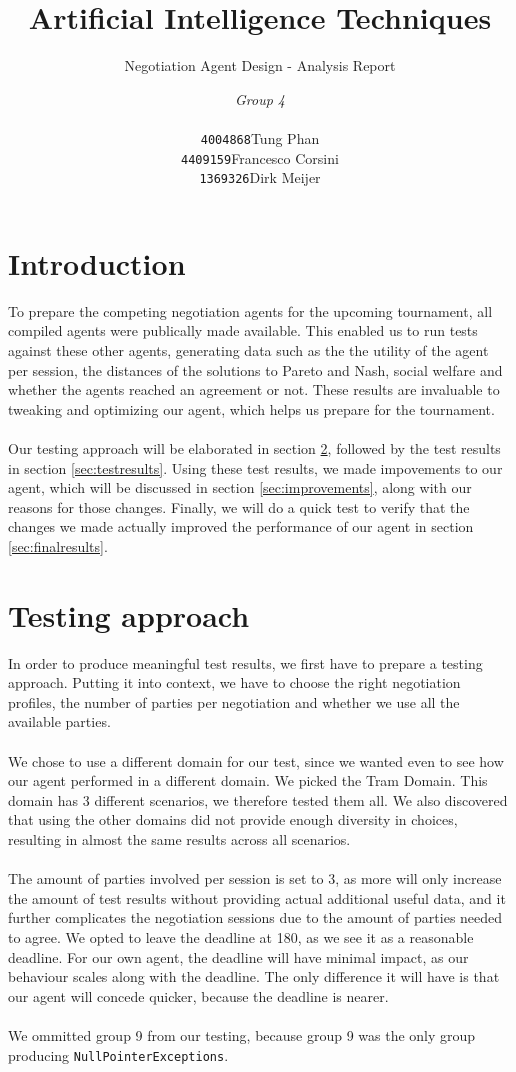 \documentclass[a4,11pt]{scrartcl}
\title{Artificial Intelligence Techniques}
\subtitle{Negotiation Agent Design - Analysis Report}
\author{\emph{Group 4}\\
\begin{tabular}{ll}
\texttt{4004868}&Tung Phan\\
\texttt{4409159}&Francesco Corsini\\
\texttt{1369326}&Dirk Meijer
\end{tabular}}
\begin{document}
\maketitle

\null\vfill
\tableofcontents
\pagebreak

\section{Introduction}
To prepare the competing negotiation agents for the upcoming tournament, all compiled agents were publically made available. This enabled us to run tests against these other agents, generating data such as the the utility of the agent per session, the distances of the solutions to Pareto and Nash, social welfare and whether the agents reached an agreement or not. These results are invaluable to tweaking and optimizing our agent, which helps us prepare for the tournament.
\\ \\
Our testing approach will be elaborated in section \ref{sec:testingapproach}, followed by the test results in section \ref{sec:testresults}. Using these test results, we made impovements to our agent, which will be discussed in section \ref{sec:improvements}, along with our reasons for those changes. Finally, we will do a quick test to verify that the changes we made actually improved the performance of our agent in section \ref{sec:finalresults}.
    
\section{Testing approach}
\label{sec:testingapproach}
In order to produce meaningful test results, we first have to prepare a testing approach. Putting it into context, we have to choose the right negotiation profiles, the number of parties per negotiation and whether we use all the available parties.
\\ \\
We chose to use a different domain for our test, since we wanted even to see how our agent performed in a different domain. We picked the Tram Domain. This domain has 3 different scenarios, we therefore tested them all. We also discovered that using the other domains did not provide enough diversity in choices, resulting in almost the same results across all scenarios. 
\\ \\
The amount of parties involved per session is set to 3, as more will only increase the amount of test results without providing actual additional useful data, and it further complicates the negotiation sessions due to the amount of parties needed to agree.
We opted to leave the deadline at 180, as we see it as a reasonable deadline. For our own agent, the deadline will have minimal impact, as our behaviour scales along with the deadline. The only difference it will have is that our agent will concede quicker, because the deadline is nearer.
\\ \\
We ommitted group 9 from our testing, because group 9 was the only group producing \verb|NullPointerExceptions|.
\end{document}
